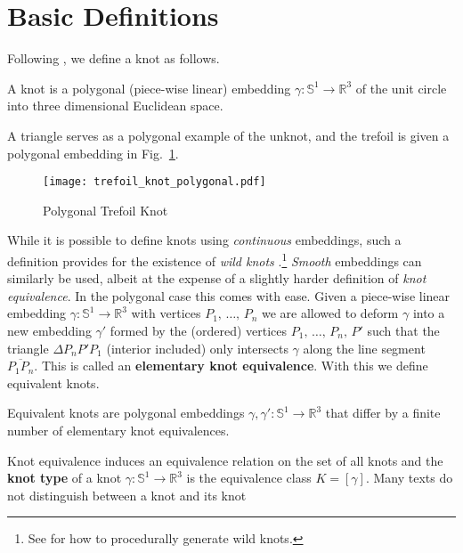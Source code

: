 \section{Basic Definitions}
    Following \cite[p.~15]{LivingstonKnotTheory}, we define a knot as follows.
    \begin{definition}
        A knot is a polygonal (piece-wise linear) embedding
        $\gamma:\mathbb{S}^{1}\rightarrow\mathbb{R}^{3}$ of the unit circle
        into three dimensional Euclidean space.
    \end{definition}
    A triangle serves as a polygonal example of the unknot, and the trefoil is
    given a polygonal embedding in Fig.~\ref{fig:trefoil_knot_polygonal}.
    \begin{figure}
        \centering
        \texttt{[image: trefoil\_knot\_polygonal.pdf]}
        \caption{Polygonal Trefoil Knot}
        \label{fig:trefoil_knot_polygonal}
    \end{figure}
    While it is possible to define knots using \textit{continuous} embeddings,
    such a definition provides for the existence of
    \textit{wild knots} \cite{FoxArtinWildKnots1948}.\footnote{%
        See \cite{BrowneWildKnots} for how to procedurally generate wild knots.
    }
    \textit{Smooth} embeddings can similarly be used, albeit at the expense of
    a slightly harder definition of \textit{knot equivalence}. In the polygonal
    case this comes with ease. Given a piece-wise linear embedding
    $\gamma:\mathbb{S}^{1}\rightarrow\mathbb{R}^{3}$ with vertices
    $P_{1},\,\dots,\,P_{n}$ we are allowed to deform $\gamma$ into a new
    embedding $\gamma'$ formed by the (ordered) vertices
    $P_{1},\,\dots,\,P_{n},\,P'$
    such that the triangle $\Delta{P}_{n}P'P_{1}$ (interior included)
    only intersects $\gamma$
    along the line segment $\overline{P_{1}P_{n}}$. This is called an
    \textbf{elementary knot equivalence}. With this we define equivalent knots.
    \begin{definition}
        Equivalent knots are polygonal embeddings
        $\gamma,\gamma':\mathbb{S}^{1}\rightarrow\mathbb{R}^{3}$ that differ by
        a finite number of elementary knot equivalences.
    \end{definition}
    Knot equivalence induces an equivalence relation on the set of all knots
    and the \textbf{knot type} of a knot
    $\gamma:\mathbb{S}^{1}\rightarrow\mathbb{R}^{3}$ is the equivalence class
    $K=[\gamma]$. Many texts do not distinguish between a knot and its knot
